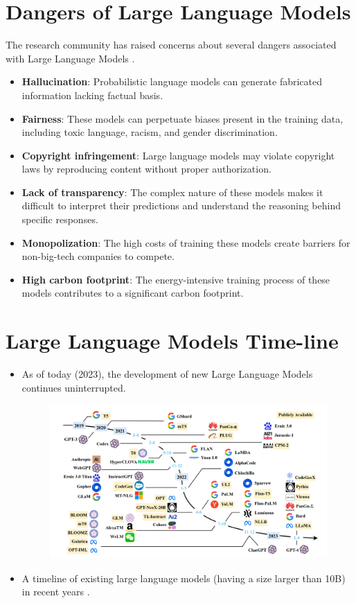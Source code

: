 \section{Dangers of Large Language Models}
The research community has raised concerns about several dangers associated with Large Language Models \cite{bender2021dangers}.
\begin{itemize}
\item \textbf{Hallucination}: Probabilistic language models can generate fabricated information lacking factual basis.
\item \textbf{Fairness}: These models can perpetuate biases present in the training data, including toxic language, racism, and gender discrimination.
\item \textbf{Copyright infringement}: Large language models may violate copyright laws by reproducing content without proper authorization.
\item \textbf{Lack of transparency}: The complex nature of these models makes it difficult to interpret their predictions and understand the reasoning behind specific responses.
\item \textbf{Monopolization}: The high costs of training these models create barriers for non-big-tech companies to compete.
\item \textbf{High carbon footprint}: The energy-intensive training process of these models contributes to a significant carbon footprint.
\end{itemize}


\section{Large Language Models Time-line}
\begin{itemize}
\item As of today (2023), the development of new Large Language Models continues uninterrupted.
 \begin{figure}[h]
        	\includegraphics[scale = 0.33]{pics/llmtimeline.png}
        \end{figure}
\item A timeline of existing large language models (having a size larger than 10B) in recent years \cite{zhao2023survey}.
\end{itemize}



